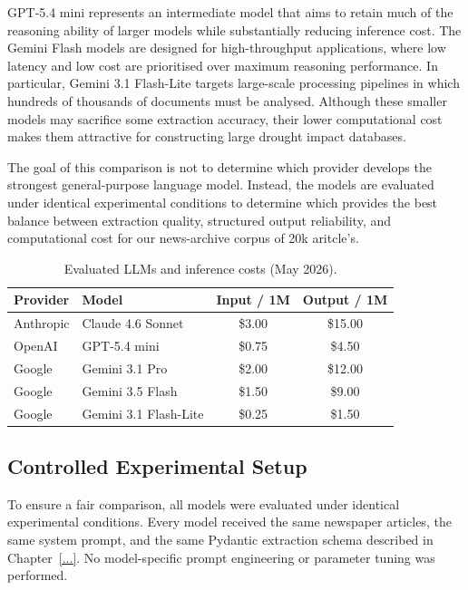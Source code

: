 GPT-5.4 mini represents an intermediate model that aims to retain much of the reasoning ability of larger models while substantially reducing inference cost. The Gemini Flash models are designed for high-throughput applications, where low latency and low cost are prioritised over maximum reasoning performance. In particular, Gemini 3.1 Flash-Lite targets large-scale processing pipelines in which hundreds of thousands of documents must be analysed. Although these smaller models may sacrifice some extraction accuracy, their lower computational cost makes them attractive for constructing large drought impact databases. 

The goal of this comparison is not to determine which provider develops the strongest general-purpose language model. Instead, the models are evaluated under identical experimental conditions to determine which provides the best balance between extraction quality, structured output reliability, and computational cost for our news-archive corpus of 20k aritcle's. 

\begin{table}[h!]
\centering
\caption{Evaluated LLMs and inference costs (May 2026).}
\label{tab:evaluated_models}
\small
\begin{tabular}{llcc}
\hline
\textbf{Provider} & \textbf{Model} & \textbf{Input / 1M} & \textbf{Output / 1M} \\
\hline
Anthropic & Claude 4.6 Sonnet & \$3.00 & \$15.00 \\
OpenAI & GPT-5.4 mini & \$0.75 & \$4.50 \\
Google & Gemini 3.1 Pro & \$2.00 & \$12.00 \\
Google & Gemini 3.5 Flash & \$1.50 & \$9.00 \\
Google & Gemini 3.1 Flash-Lite & \$0.25 & \$1.50 \\
\hline
\end{tabular}
\end{table}

\subsection{Controlled Experimental Setup}

To ensure a fair comparison, all models were evaluated under identical experimental conditions. Every model received the same newspaper articles, the same system prompt, and the same Pydantic extraction schema described in Chapter~\ref{...}. No model-specific prompt engineering or parameter tuning was performed.

